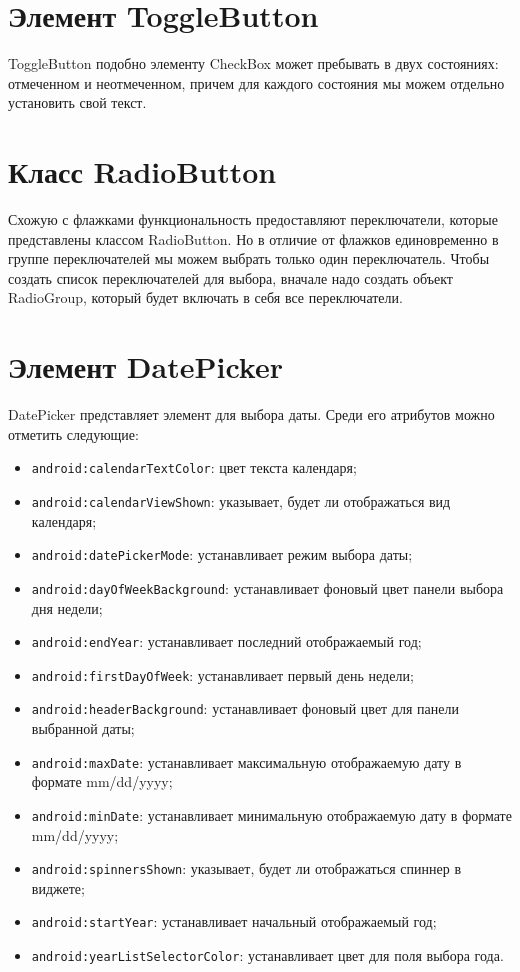 \section{Элемент ToggleButton}
ToggleButton подобно элементу CheckBox может пребывать в двух 
состояниях: отмеченном и неотмеченном, причем для каждого состояния мы 
можем отдельно установить свой текст.

\section{Класс RadioButton}
Схожую с флажками функциональность предоставляют 
переключатели, которые представлены классом RadioButton. Но в отличие от 
флажков единовременно в группе переключателей мы можем выбрать только 
один переключатель. Чтобы создать список переключателей для выбора, 
вначале надо создать объект RadioGroup, который будет включать в себя все 
переключатели.

\section{Элемент DatePicker}
DatePicker представляет элемент для выбора даты. Среди его атрибутов 
можно отметить следующие:
\begin{itemize}
	\item \texttt{android:calendarTextColor}: цвет текста календаря;
	\item \texttt{android:calendarViewShown}: указывает, будет ли
		отображаться вид календаря;
	\item \texttt{android:datePickerMode}: устанавливает режим выбора даты;
	\item \texttt{android:dayOfWeekBackground}: устанавливает фоновый цвет
		панели выбора дня недели;
	\item \texttt{android:endYear}: устанавливает последний отображаемый год;
	\item \texttt{android:firstDayOfWeek}: устанавливает первый день недели;
	\item \texttt{android:headerBackground}: устанавливает фоновый цвет
		для панели выбранной даты;
	\item \texttt{android:maxDate}: устанавливает максимальную отображаемую
		дату в формате mm/dd/yyyy;
	\item \texttt{android:minDate}: устанавливает минимальную отображаемую
		дату в формате mm/dd/yyyy;
	\item \texttt{android:spinnersShown}: указывает, будет ли отображаться
		спиннер в виджете;
	\item \texttt{android:startYear}: устанавливает начальный
		отображаемый год;
	\item \texttt{android:yearListSelectorColor}: устанавливает цвет для
		поля выбора года.
\end{itemize}

